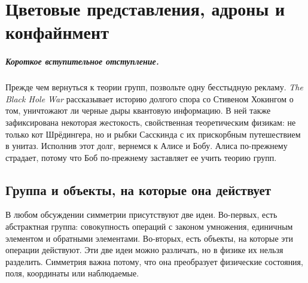 \chapter{Цветовые представления, адроны и конфайнмент}

\paragraph{Короткое вступительное отступление.}
Прежде чем вернуться к теории групп, позвольте одну бесстыдную рекламу. \emph{The Black Hole War} рассказывает историю долгого спора со Стивеном Хокингом о том, уничтожают ли черные дыры квантовую информацию. В ней также зафиксирована некоторая жестокость, свойственная теоретическим физикам: не только кот Шрёдингера, но и рыбки Сасскинда с их прискорбным путешествием в унитаз. Исполнив этот долг, вернемся к Алисе и Бобу. Алиса по-прежнему страдает, потому что Боб по-прежнему заставляет ее учить теорию групп.


\section{Группа и объекты, на которые она действует}

В любом обсуждении симметрии присутствуют две идеи. Во-первых, есть абстрактная группа: совокупность операций с законом умножения, единичным элементом и обратными элементами. Во-вторых, есть объекты, на которые эти операции действуют. Эти две идеи можно различать, но в физике их нельзя разделить. Симметрия важна потому, что она преобразует физические состояния, поля, координаты или наблюдаемые.

\begin{classroomqa}
\end{classroomqa}


